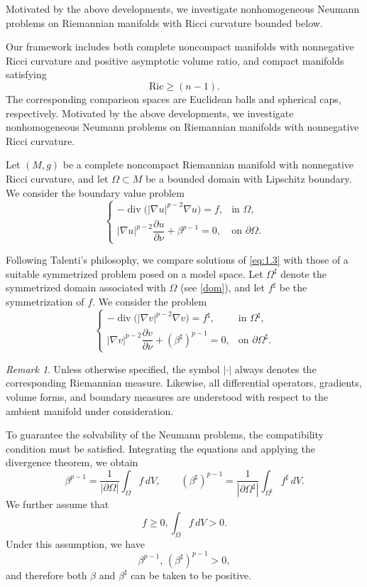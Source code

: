 \documentclass[11pt]{article}
\numberwithin{equation}{section}
\theoremstyle{definition}
\theoremstyle{remark}
\newtheorem{remark}[theorem]{Remark}
\begin{document}
Motivated by the above developments, we investigate
nonhomogeneous Neumann problems on Riemannian manifolds
with Ricci curvature bounded below.

Our framework includes both complete noncompact manifolds
with nonnegative Ricci curvature and positive asymptotic
volume ratio, and compact manifolds satisfying
\[
\mathrm{Ric}\ge (n-1).
\]
The corresponding comparison spaces are Euclidean balls
and spherical caps, respectively.
Motivated by the above developments, 
we investigate nonhomogeneous Neumann problems on Riemannian manifolds with nonnegative Ricci curvature.

Let $(M,g)$ be a complete noncompact Riemannian manifold with nonnegative Ricci curvature, 
and let $\Omega\subset M$ be a bounded domain with Lipschitz boundary. 
We consider the boundary value problem
\begin{equation}\label{eq:1.3}
\begin{cases}
-\operatorname{div}\bigl(|\nabla u|^{p-2}\nabla u\bigr)=f,
& \text{in }\Omega,
\\[1ex]
|\nabla u|^{p-2}\dfrac{\partial u}{\partial\nu}
+\beta^{p-1}=0,
& \text{on }\partial\Omega.
\end{cases}
\end{equation}

Following Talenti's philosophy, 
we compare solutions of \eqref{eq:1.3} with those of a suitable symmetrized problem posed on a model space. 
Let $\Omega^\sharp$ denote the symmetrized domain associated with $\Omega$ (see \ref{dom}), 
and let $f^\sharp$ be the symmetrization of $f$. We consider the problem
\begin{equation}\label{eq:1.4}
\begin{cases}
-\operatorname{div}\bigl(|\nabla v|^{p-2}\nabla v\bigr)
=
f^\sharp,
& \text{in }\Omega^\sharp,
\\[1ex]
|\nabla v|^{p-2}
\dfrac{\partial v}{\partial\nu}
+
(\beta^\sharp)^{p-1}
=
0,
& \text{on }\partial\Omega^\sharp.
\end{cases}
\end{equation}


\begin{remark}
Unless otherwise specified, 
the symbol $|\cdot|$ always denotes the corresponding Riemannian measure.
 Likewise, all differential operators, gradients, volume forms, 
 and boundary measures are understood with respect to the ambient manifold under consideration.
\end{remark}
To guarantee the solvability of the Neumann problems, the compatibility condition must be satisfied. Integrating the equations and applying the divergence theorem, we obtain
\begin{equation}
\beta^{p-1}
=
\frac{1}{|\partial\Omega|}
\int_\Omega f\,dV,
\qquad
(\beta^\sharp)^{p-1}
=
\frac{1}{|\partial\Omega^\sharp|}
\int_{\Omega^\sharp}
f^\sharp\,dV.
\end{equation}
We further assume that
\[
f \ge 0, \int_\Omega f\,dV > 0.
\]
Under this assumption, we have
\[
\beta^{p-1},\, (\beta^\sharp)^{p-1} > 0,
\]
and therefore both $\beta$ and $\beta^\sharp$ can be taken to be positive.
 
\end{document}

